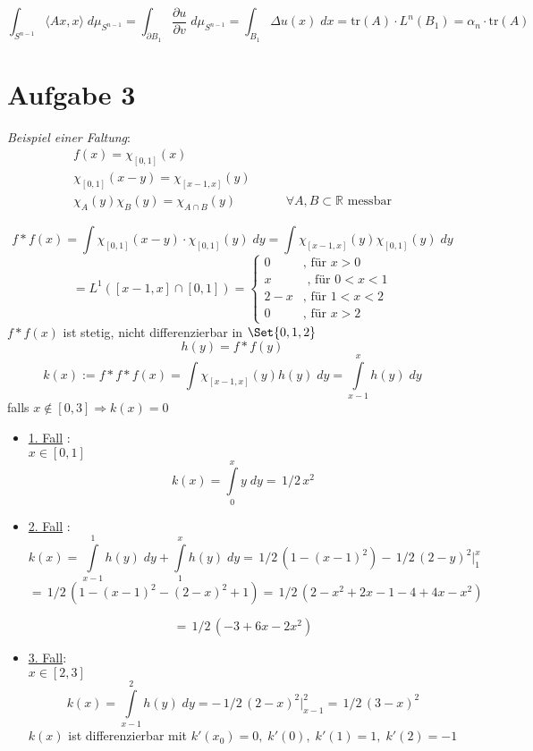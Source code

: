 \documentclass[11pt]{article}
\newcommand{\pau}{\partial u}
\newcommand{\pav}{\partial v}
\begin{document}
$$\int_{S^{n-1}} \langle Ax, x \rangle \; d\mu_{S^{n-1}} = \int_{\partial B_1} \dfrac{\pau}{\pav} \; d\mu_{S^{n-1}}  = \int_{B_1} \Delta u(x) \; dx = \text{tr}(A) \cdotp L^n(B_1) = \alpha_n \cdotp \text{tr}(A)$$


\section{Aufgabe 3}
\emph{Beispiel einer Faltung}: \\
\begin{align}
f(x) = \chi_{[0,1]}(x) \\
\chi_{[0,1]} (x-y) = \chi_{[x-1, x]}(y) \\
\chi_A (y) \chi_B (y) = \chi_{A \cap B}(y) & \qquad \forall A, B \subset \mathbb R \text{ messbar}
\end{align}

$$f \ast  f(x) = \int \chi_{[0,1]}(x-y) \cdotp \chi_{[0,1]} (y) \; dy = \int \chi_{[x-1, x]}(y) \chi_{[0,1]}(y) \; dy$$
\begin{equation}
= L^1\left([x-1, x] \cap [0, 1]\right) = 
\begin{cases}
	0 & \text{, für } x > 0 \\
	x & \text{ , für } 0 < x < 1\\
	2-x & \text{, für } 1 < x < 2 \\
	0 & \text{, für } x > 2
\end{cases}
\end{equation}
$f \ast  f(x)$ ist stetig, nicht differenzierbar in $\Set{0, 1, 2}$ 
$$h(y) = f \ast f(y) $$
$$ k(x):= f \ast f \ast  f (x) = \int \chi_{[x-1, x]}(y) h(y) \; dy = \int\limits_{x-1}^x h(y) \; dy$$
falls $x \notin [0, 3] \Rightarrow k(x) = 0$
\begin{itemize}
	\item \underline{1. Fall} : \\
	$x \in [0, 1]$
	$$k(x) = \int\limits_0^x y \; dy = \,1/2\, x^2$$
	\item \underline{2. Fall} : \\
	$$k(x) = \int\limits_{x-1}^1 h(y) \; dy + \int\limits_1^x h(y) \; dy = \,1/2\, \left(1-(x-1)^2\right)-\,1/2\, (2-y)^2 \vert_1^x$$ 
	$$ = \,1/2\, \left(1-(x-1)^2 -(2-x)^2 + 1\right) = \,1/2\, \left(2-x^2+ 2x - 1-4 + 4x - x^2\right) $$
	\par
	$$ = \,1/2\,(-3 + 6x - 2x^2)$$
	\item \underline{3. Fall}: \\
	$x \in [2,3]$
	$$k(x) = \int\limits_{x-1}^2 h(y) \; dy = -\,1/2\, (2-x)^2 \vert_{x-1}^2 = \,1/2\, (3-x)^2$$
	$k(x)$ ist differenzierbar mit $k'(x_0) = 0, \;k'(0),\; k'(1) = 1,\; k'(2) = -1$
\end{itemize}
\end{document}
